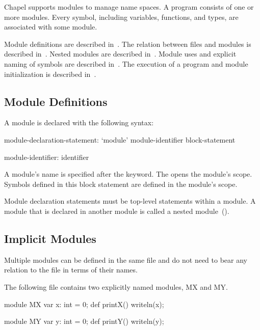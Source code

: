 \label{Modules}


Chapel supports modules to manage name spaces.  A program consists of
one or more modules.  Every symbol, including variables, functions,
and types, are associated with some module.

Module definitions are described in~.  The
relation between files and modules is described
in~.  Nested modules are described
in~.  Module uses and explicit naming of symbols
are described in~.  The execution of a program and
module initialization is described in~.

\subsection{Module Definitions}
\label{Module_Definitions}


A module is declared with the following syntax:
\begin{syntax}
module-declaration-statement:
  `module' module-identifier block-statement

module-identifier:
  identifier
\end{syntax}
A module's name is specified after the  keyword.
The  opens the module's scope.  Symbols defined
in this block statement are defined in the module's scope.

Module declaration statements must be top-level statements within a
module.  A module that is declared in another module is called a
nested module~().

\subsection{Implicit Modules}
\label{Implicit_Modules}

Multiple modules can be defined in the same file and do not need to
bear any relation to the file in terms of their names.

\begin{example}
The following file contains two explicitly named modules, MX and MY.
\begin{chapelcode}
module MX {
  var x: int = 0;
  def printX() {
    writeln(x);
  }
}

module MY {
  var y: int = 0;
  def printY() {
    writeln(y);
  }
}
\end{chapelcode}
\end{example}

